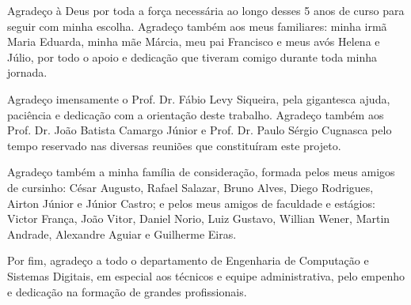 \documentclass[]{politex}
\begin{document}
\capa
\falsafolhaderosto
\folhaderosto









\begin{agradecimentos}
Agradeço à Deus por toda a força necessária ao longo desses 5 anos de curso para seguir com minha escolha. Agradeço também aos meus familiares: minha irmã Maria Eduarda, minha mãe Márcia, meu pai Francisco e meus avós Helena e Júlio, por todo o apoio e dedicação que tiveram comigo durante toda minha jornada.

Agradeço imensamente o Prof. Dr. Fábio Levy Siqueira, pela gigantesca ajuda, paciência e dedicação com a orientação deste trabalho. Agradeço também aos Prof. Dr. João Batista Camargo Júnior e Prof. Dr. Paulo Sérgio Cugnasca pelo tempo reservado nas diversas reuniões que constituíram este projeto.

Agradeço também a minha família de consideração, formada pelos meus amigos de cursinho: César Augusto, Rafael Salazar, Bruno Alves, Diego Rodrigues, Airton Júnior e Júnior Castro; e pelos meus amigos de faculdade e estágios: Victor França, João Vitor, Daniel Norio, Luiz Gustavo, Willian Wener, Martin Andrade, Alexandre Aguiar e Guilherme Eiras.

Por fim, agradeço a todo o departamento de Engenharia de Computação e Sistemas Digitais, em especial aos técnicos e equipe administrativa, pelo empenho e dedicação na formação de grandes profissionais.
\end{agradecimentos}


\end{document}
